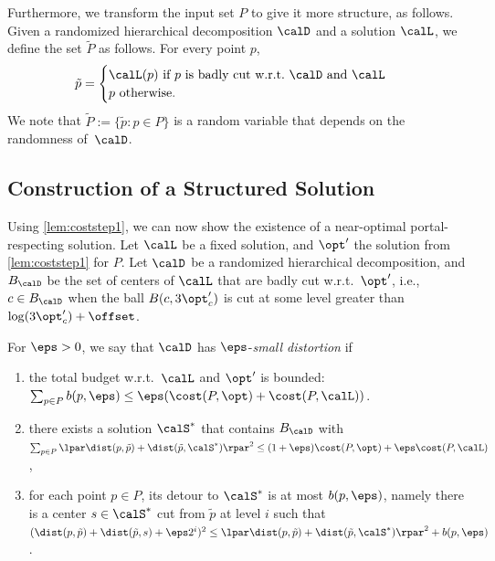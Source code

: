 Furthermore, we transform the input set $P$ to give it more structure, as follows.
Given a randomized hierarchical decomposition $\calD$ and a solution $\calL$, we define the set $\tilde P$ as follows. For every point $p$, 
\begin{equation*}
\tilde p = \begin{cases}
    \calL(p) \text{ if $p$ is badly cut w.r.t.\ } \calD \text{ and } \calL\\ p \text{ otherwise.}
\end{cases}
\end{equation*}
We note that $\tilde P := \{\tilde p: p \in P\}$ is a random variable that depends on the randomness of~$\calD$.

\subsection{Construction of a Structured Solution}\label{sec:constructS*}

Using \cref{lem:coststep1}, we can now show the existence of a near-optimal portal-respecting solution. 
Let $\calL$ be a fixed solution, and $\opt'$ the solution from \cref{lem:coststep1} for $P$.
 Let $\calD$ be a randomized hierarchical decomposition, and $B_{\calD}$ be the set of centers of $\calL$ that are badly cut w.r.t.\ $\opt'$, i.e., $c\in B_{\calD}$ when the ball $B(c,3\opt'_c)$ is cut at some level greater than $\log(3\opt'_c)+\offset$. 


\begin{definition}\label{def:smallDist}
For $\eps  > 0$, we say that $\calD$ has $\eps$-\emph{small distortion} if 
\begin{enumerate}
\item \label{prop:budget} 
the total budget w.r.t.\ $\calL$ and $\opt'$ is bounded: $\sum_{p \in P} b(p, \eps) \leq \eps (\cost(P, \opt) + \cost(P, \calL))$.
\item\label{prop:costSstar} there exists a solution $ \calS^*$ that contains $B_{\calD}$ 
with $\sum_{p \in P} \lpar \dist(p, \tilde p) + \dist(\tilde p,  \calS^*)\rpar^2 \leq (1+\eps)\cost(P, \opt) + \eps \cost(P, \calL)$,
\item\label{prop:det} for each point $p \in P$, its detour to $\calS^*$ is at most $b(p, \eps)$, namely there is a center $s \in \calS^*$ cut from $\tilde p$ at level $i$ such that $(\dist(p, \tilde p) + \dist(\tilde p, s) + \eps 2^i)^2 \leq \lpar\dist(p, \tilde p) + \dist(\tilde p, \calS^*)\rpar^2 + b(p, \eps)$.
\end{enumerate}
\end{definition}

